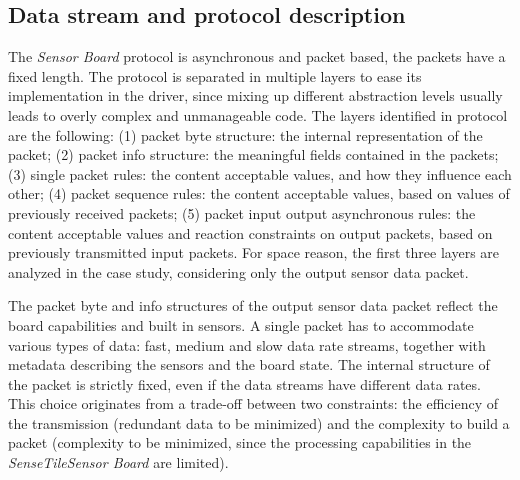 \documentclass[english]{lni}
\newcommand{\ST}{\emph{SenseTile}\xspace}
\newcommand{\SB}{\emph{Sensor Board}\xspace}
\newcommand{\STSB}{\ST \SB\xspace}
\begin{document}
\subsection{Data stream and protocol description}
\label{subsec:data_stream_and_protocol_description}

The \SB protocol is asynchronous and packet based, the packets have a fixed length.  
The protocol is separated in multiple layers to ease its implementation in the driver, since mixing up different abstraction levels usually leads to overly complex and unmanageable code.  
The layers identified in protocol are the following: (1) packet byte structure: the internal representation of the packet; (2) packet info structure: the meaningful fields contained in the packets; (3) single packet rules: the content acceptable values, and how they influence each other; (4) packet sequence rules: the content acceptable values, based on values of previously received packets; (5) packet input output asynchronous rules: the content acceptable values and reaction constraints on output packets, based on previously transmitted input packets.
For space reason, the first three layers are analyzed in the case study, considering only the output sensor data packet.

The packet byte and info structures of the output sensor data packet reflect the board capabilities and built in sensors. 
A single packet has to accommodate various types of data: fast, medium and slow data rate streams, together with metadata describing the sensors and the board state.
The internal structure of the packet is strictly fixed, even if the data streams have different data rates. 
This choice originates from a trade-off between two constraints: the efficiency of the transmission (redundant data to be minimized) and the complexity to build a packet (complexity to be minimized, since the processing capabilities in the \STSB are limited). 
\end{document}
